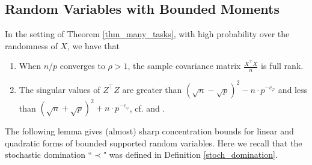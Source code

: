\subsection{Random Variables with Bounded Moments}

\begin{fact}\label{fact_minv}
	In the setting of Theorem \ref{thm_many_tasks}, with high probability over the randomness of $X$, we have that
	\begin{enumerate}
		\item When $n / p$ converges to $\rho > 1$, the sample covariance matrix $\frac{X^{\top}X}{n}$ is full rank.
		\item The singular values of $Z^{\top}Z$ are greater than $(\sqrt{n} - \sqrt{p})^2 - n \cdot p^{-c_{\varphi}}$ and less than $(\sqrt{n} + \sqrt{p})^2 + n \cdot p^{-c_{\varphi}}$, cf. \citet[Theorem 2.10]{isotropic} and \citet[Lemma 3.12]{DY}.
	\end{enumerate}
\end{fact}

The following lemma gives (almost) sharp concentration bounds for linear and quadratic forms of bounded supported random variables. Here we recall that the stochastic domination ``$\prec$" was defined in Definition \ref{stoch_domination}.

